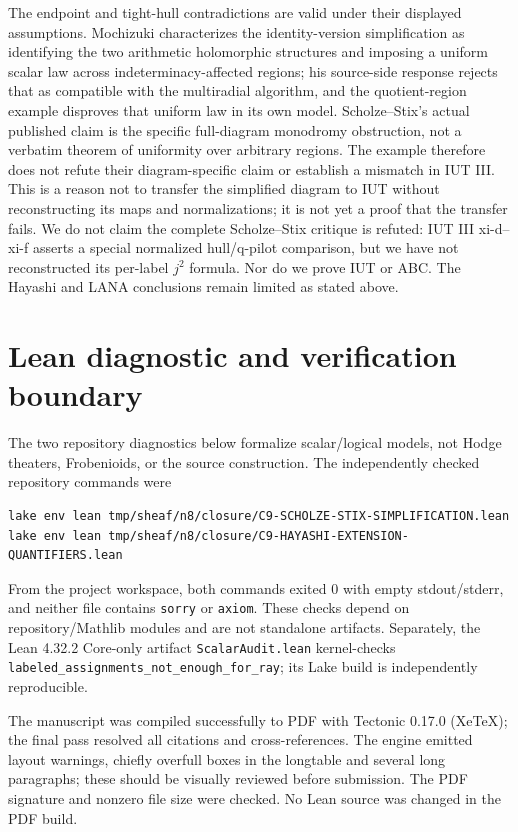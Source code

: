 \documentclass[11pt]{article}
\begin{document}
The endpoint and tight-hull contradictions are valid under their displayed assumptions. Mochizuki characterizes the identity-version simplification as identifying the two arithmetic holomorphic structures and imposing a uniform scalar law across indeterminacy-affected regions; his source-side response rejects that as compatible with the multiradial algorithm, and the quotient-region example disproves that uniform law in its own model. Scholze--Stix's actual published claim is the specific full-diagram monodromy obstruction, not a verbatim theorem of uniformity over arbitrary regions. The example therefore does not refute their diagram-specific claim or establish a mismatch in IUT III. This is a reason not to transfer the simplified diagram to IUT without reconstructing its maps and normalizations; it is not yet a proof that the transfer fails. We do not claim the complete Scholze--Stix critique is refuted: IUT III xi-d--xi-f asserts a special normalized hull/q-pilot comparison, but we have not reconstructed its per-label $j^2$ formula. Nor do we prove IUT or ABC. The Hayashi and LANA conclusions remain limited as stated above.

\section{Lean diagnostic and verification boundary}
The two repository diagnostics below formalize scalar/logical models, not Hodge theaters, Frobenioids, or the source construction. The independently checked repository commands were
\begin{verbatim}
lake env lean tmp/sheaf/n8/closure/C9-SCHOLZE-STIX-SIMPLIFICATION.lean
lake env lean tmp/sheaf/n8/closure/C9-HAYASHI-EXTENSION-QUANTIFIERS.lean
\end{verbatim}
From the project workspace, both commands exited 0 with empty stdout/stderr, and neither file contains \texttt{sorry} or \texttt{axiom}. These checks depend on repository/Mathlib modules and are not standalone artifacts. Separately, the Lean 4.32.2 Core-only artifact \texttt{ScalarAudit.lean} kernel-checks \texttt{labeled\_assignments\_not\_enough\_for\_ray}; its Lake build is independently reproducible.

The manuscript was compiled successfully to PDF with Tectonic 0.17.0 (XeTeX); the final pass resolved all citations and cross-references. The engine emitted layout warnings, chiefly overfull boxes in the longtable and several long paragraphs; these should be visually reviewed before submission. The PDF signature and nonzero file size were checked. No Lean source was changed in the PDF build.
\end{document}
